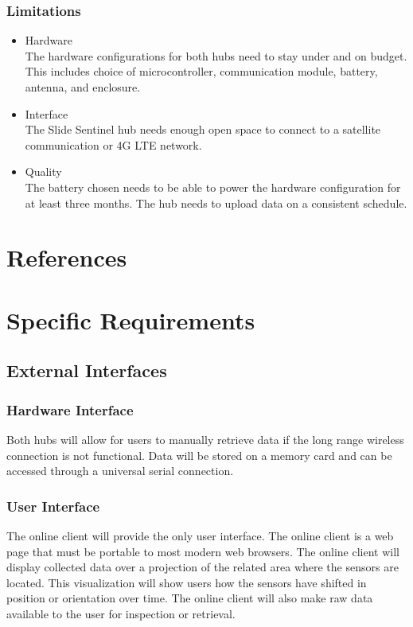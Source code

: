 \documentclass[onecolumn, draftclsnofoot,10pt, compsoc]{IEEEtran}
\begin{document}
\subsubsection{Limitations}
\begin{itemize}
    \item Hardware \\ %
        The hardware configurations for both hubs need to stay under and on budget. This includes choice of microcontroller, communication module, battery, antenna, and enclosure.
    \item Interface \\ %
        The Slide Sentinel hub needs enough open space to connect to a satellite communication or 4G LTE network.
    \item Quality \\ %
        The battery chosen needs to be able to power the hardware configuration for at least three months. The hub needs to upload data on a consistent schedule.
\end{itemize}


\section{References}


\section{Specific Requirements}

\subsection{External Interfaces} %
\subsubsection{Hardware Interface}
Both hubs will allow for users to manually retrieve data if the long range wireless connection is not functional. Data will be stored on a memory card and can be accessed through a universal serial connection.  

\subsubsection{User Interface}
The online client will provide the only user interface. The online client is a web page that must be portable to most modern web browsers. The online client will display collected data over a projection of the related area where the sensors are located. This visualization will show users how the sensors have shifted in position or orientation over time. The online client will also make raw data available to the user for inspection or retrieval.
\end{document}
